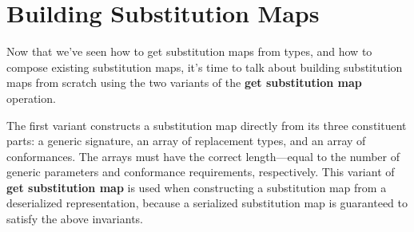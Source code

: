 \documentclass[../generics]{subfiles}
\begin{document}
\section{Building Substitution Maps}\label{buildingsubmaps}

Now that we've seen how to get substitution maps from types, and how to compose existing substitution maps, it's time to talk about building substitution maps from scratch using the two variants of the \textbf{get substitution map} operation.

The first variant constructs a substitution map directly from its three constituent parts: a generic signature, an array of replacement types, and an array of conformances. The arrays must have the correct length---equal to the number of generic parameters and conformance requirements, respectively.
This variant of \textbf{get substitution map} is used when constructing a substitution map from a deserialized representation, because a serialized substitution map is guaranteed to satisfy the above invariants.
\end{document}
